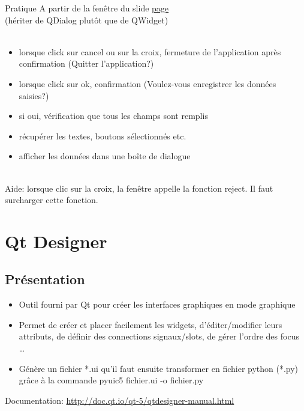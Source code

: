 \documentclass[9pt, french, brown]{beamer}
\begin{document}
\begin{frame}{\secname}{Pratique}
A partir de la fenêtre du slide \hyperlink{pratique1}{page \pageref{pratique1}}\\
(hériter de QDialog plutôt que de QWidget)\\~\\
\begin{itemize}
\item lorsque click sur cancel ou sur la croix, fermeture de l\rq{}application après confirmation (Quitter l\rq{}application?)
\item lorsque click sur ok, confirmation (Voulez-vous enregistrer les données saisies?)
\item si oui, vérification que tous les champs sont remplis
\item récupérer les textes, boutons sélectionnés etc.
\item afficher les données dans une boîte de dialogue
\end{itemize}
~\\
Aide: lorsque clic sur la croix, la fenêtre appelle la fonction reject. Il faut surcharger cette fonction.
\end{frame}


\section{Qt Designer}

\subsection{Présentation} 
\begin{frame}{\secname}{\subsecname}
\begin{itemize}
\item Outil fourni par Qt pour créer les interfaces graphiques en mode graphique
\item Permet de créer et placer facilement les widgets, d\rq{}éditer/modifier leurs attributs, de définir des connections signaux/slots, de gérer l\rq{}ordre des focus \ldots
\item Génère un fichier *.ui qu\rq{}il faut ensuite transformer en fichier python (*.py) grâce à la commande pyuic5 fichier.ui -o fichier.py
\end{itemize}
Documentation: \url{http://doc.qt.io/qt-5/qtdesigner-manual.html}
\end{frame}
\end{document}

